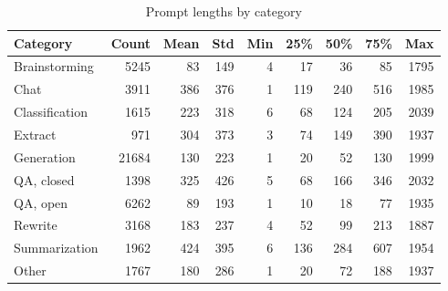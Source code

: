 \documentclass{article}
\begin{document}
\begin{table}[tp!]
    \centering
    \caption{Prompt lengths by category}
    \label{tab:prompt-lengths-by-tag}    \begin{tabular}{lrrrrrrrr}
    \toprule
    Category       &       Count & Mean &  Std & Min &  25\% &  50\% &  75\% &   Max \\
    \midrule
    Brainstorming  &        5245 &   83 &  149 &   4 &   17 &   36 &   85 &  1795 \\
    Chat           &        3911 &  386 &  376 &   1 &  119 &  240 &  516 &  1985 \\
    Classification &        1615 &  223 &  318 &   6 &   68 &  124 &  205 &  2039 \\
    Extract        &         971 &  304 &  373 &   3 &   74 &  149 &  390 &  1937 \\
    Generation     &       21684 &  130 &  223 &   1 &   20 &   52 &  130 &  1999 \\
    QA, closed     &        1398 &  325 &  426 &   5 &   68 &  166 &  346 &  2032 \\
    QA, open       &        6262 &   89 &  193 &   1 &   10 &   18 &   77 &  1935 \\
    Rewrite        &        3168 &  183 &  237 &   4 &   52 &   99 &  213 &  1887 \\
    Summarization  &        1962 &  424 &  395 &   6 &  136 &  284 &  607 &  1954 \\
    Other          &        1767 &  180 &  286 &   1 &   20 &   72 &  188 &  1937 \\
    \bottomrule
    \end{tabular}
\end{table}
\end{document}
